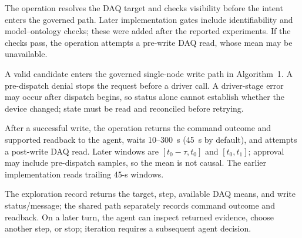 The operation resolves the DAQ target and checks visibility before the intent enters the governed path. Later implementation gates include identifiability and model--ontology checks; these were added after the reported experiments. If the checks pass, the operation attempts a pre-write DAQ read, whose mean may be unavailable.

A valid candidate enters the governed single-node write path in Algorithm~1. A pre-dispatch denial stops the request before a driver call. A driver-stage error may occur after dispatch begins, so status alone cannot establish whether the device changed; state must be read and reconciled before retrying.

After a successful write, the operation returns the command outcome and supported readback to the agent, waits 10--300~s (45~s by default), and attempts a post-write DAQ read. Later windows are $[t_0-\tau,t_0]$ and $[t_0,t_1]$; approval may include pre-dispatch samples, so the mean is not causal. The earlier implementation reads trailing 45-s windows.

The exploration record returns the target, step, available DAQ means, and write status/message; the shared path separately records command outcome and readback. On a later turn, the agent can inspect returned evidence, choose another step, or stop; iteration requires a subsequent agent decision.



